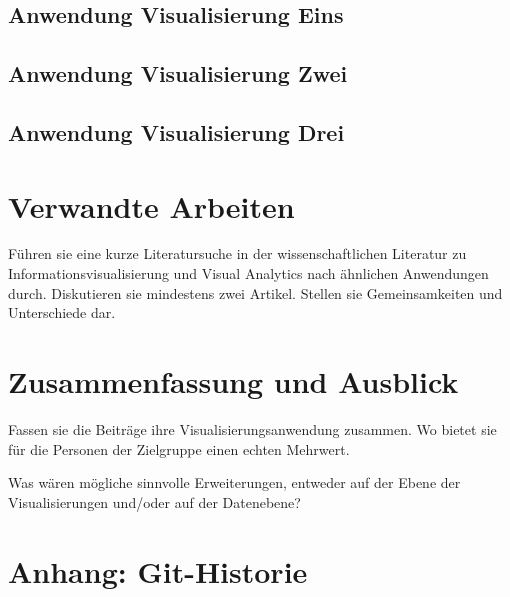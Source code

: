 \documentclass[usegeometry=true]{scrartcl}
\begin{document}
\subsection{Anwendung Visualisierung Eins}
\subsection{Anwendung Visualisierung Zwei}
\subsection{Anwendung Visualisierung Drei}

\section{Verwandte Arbeiten}
Führen sie eine kurze Literatursuche in der wissenschaftlichen Literatur zu Informationsvisualisierung und Visual Analytics nach ähnlichen Anwendungen durch. Diskutieren sie mindestens zwei Artikel. Stellen sie Gemeinsamkeiten und Unterschiede dar.

\section{Zusammenfassung und Ausblick}
Fassen sie die Beiträge ihre Visualisierungsanwendung zusammen. Wo bietet sie für die Personen der Zielgruppe einen echten Mehrwert.

Was wären mögliche sinnvolle Erweiterungen, entweder auf der Ebene der Visualisierungen und/oder auf der Datenebene?

\section*{Anhang: Git-Historie}
\newpage

\end{document}

